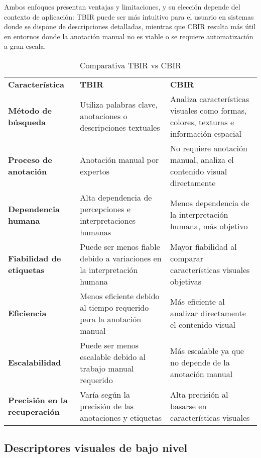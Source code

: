 Ambos enfoques presentan ventajas y limitaciones, y su elección depende del contexto de aplicación: TBIR puede ser más intuitivo para el usuario en sistemas donde se dispone de descripciones detalladas, mientras que CBIR resulta más útil en entornos donde la anotación manual no es viable o se requiere automatización a gran escala.

\begin{table}[H]
    \centering
    \renewcommand{\arraystretch}{1.5}
    \begin{tabular}{p{5cm}p{5cm}p{5cm}}
        \rowcolor{gray!30}
        \textbf{Característica} & \textbf{TBIR} & \textbf{CBIR} \\
        \rowcolor{gray!10}
        \textbf{Método de búsqueda} & Utiliza palabras clave, anotaciones o descripciones textuales & Analiza características visuales como formas, colores, texturas e información espacial \\
        \addlinespace
        \textbf{Proceso de anotación} & Anotación manual por expertos & No requiere anotación manual, analiza el contenido visual directamente \\
        \rowcolor{gray!10}
        \textbf{Dependencia humana} & Alta dependencia de percepciones e interpretaciones humanas & Menos dependencia de la interpretación humana, más objetivo \\
        \addlinespace
        \textbf{Fiabilidad de etiquetas} & Puede ser menos fiable debido a variaciones en la interpretación humana & Mayor fiabilidad al comparar características visuales objetivas \\
        \rowcolor{gray!10}
        \textbf{Eficiencia} & Menos eficiente debido al tiempo requerido para la anotación manual & Más eficiente al analizar directamente el contenido visual \\
        \addlinespace
        \textbf{Escalabilidad} & Puede ser menos escalable debido al trabajo manual requerido & Más escalable ya que no depende de la anotación manual \\
        \rowcolor{gray!10}
        \textbf{Precisión en la recuperación} & Varía según la precisión de las anotaciones y etiquetas & Alta precisión al basarse en características visuales \\
    \end{tabular}
    \caption{Comparativa TBIR vs CBIR}
    \label{tab:tbir-cbir}
\end{table}

\subsection{Descriptores visuales de bajo nivel}

